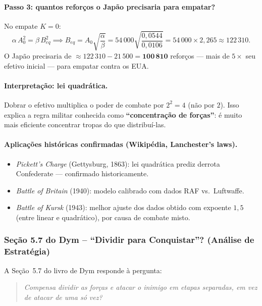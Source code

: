 \documentclass[12pt,a4paper]{article}
\theoremstyle{definition}
\begin{document}
\paragraph{Passo 3: quantos refor\c{c}os o Jap\~ao precisaria para empatar?}
No empate $K = 0$:
\begin{equation}
  \alpha\,A_0^2 = \beta\,B_{eq}^2
  \implies
  B_{eq} = A_0\sqrt{\frac{\alpha}{\beta}}
         = 54\,000\sqrt{\frac{0{,}0544}{0{,}0106}}
         = 54\,000\times 2{,}265 \approx 122\,310.
\end{equation}
O Jap\~ao precisaria de $\approx 122\,310 - 21\,500 = \mathbf{100\,810}$ refor\c{c}os
--- mais de $5\times$ seu efetivo inicial --- para empatar contra os EUA.

\paragraph{Interpreta\c{c}\~ao: lei quadr\'atica.}
Dobrar o efetivo multiplica o poder de combate por $2^2 = 4$ (n\~ao por $2$).
Isso explica a regra militar conhecida como \textbf{``concentra\c{c}\~ao de for\c{c}as''}:
\'e muito mais eficiente concentrar tropas do que distribu\'i-las.

\paragraph{Aplica\c{c}\~oes hist\'oricas confirmadas (Wikip\'edia, Lanchester's laws).}
\begin{itemize}
  \item \textit{Pickett's Charge} (Gettysburg, 1863): lei quadr\'atica prediz
    derrota Confederate --- confirmado historicamente.
  \item \textit{Battle of Britain} (1940): modelo calibrado com dados RAF vs.\ Luftwaffe.
  \item \textit{Battle of Kursk} (1943): melhor ajuste dos dados obtido com expoente $1{,}5$
    (entre linear e quadr\'atico), por causa de combate misto.
\end{itemize}

\subsubsection*{Se\c{c}\~ao 5.7 do Dym -- ``Dividir para Conquistar''? (An\'alise de Estrat\'egia)}

A Se\c{c}\~ao~5.7 do livro de Dym responde \`a pergunta:
\begin{quote}
  \itshape Compensa dividir as for\c{c}as e atacar o inimigo em etapas separadas,
  em vez de atacar de uma s\'o vez?
\end{quote}
\end{document}
